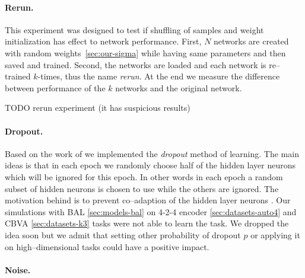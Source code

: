 \paragraph{Rerun.} This experiment was designed to test if shuffling of samples and weight initialization has effect to network performance. First, $N$ networks are created with random weights~\ref{sec:our-sigma} while having same parameters and then saved and trained. Second, the networks are loaded and each network is re--trained $k$-times, thus the name \emph{rerun}. At the end we measure the difference between performance of the $k$ networks and the original network. 

TODO rerun experiment (it has suspicious results) 



\paragraph{Dropout.}
Based on the work of \citet{hinton2012improving} we implemented the \emph{dropout} method of learning. The main ideas is that in each epoch we randomly choose half of the hidden layer neurons which will be ignored for this epoch. In other words in each epoch a random subset of hidden neurons is chosen to use while the others are ignored. The motivation behind is to prevent co--adaption of the hidden layer neurons \citep{hinton2012improving}. Our simulations with BAL \ref{sec:models-bal} on 4-2-4 encoder \ref{sec:datasets-auto4} and CBVA \ref{sec:datasets-k3} tasks were not able to learn the task. We dropped the idea soon but we admit that setting other probability of dropout $p$ or applying it on high--dimensional tasks could have a positive impact. 

\paragraph{Noise.} 

